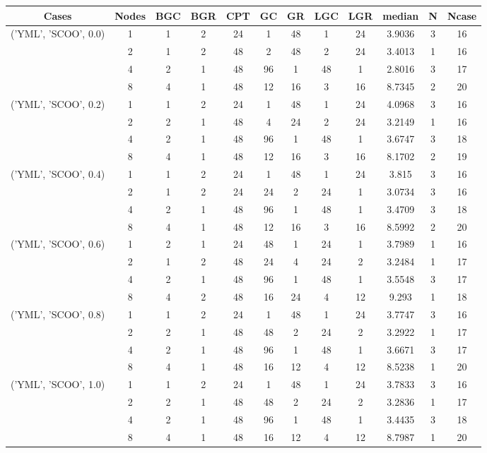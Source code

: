 \begin{tabular}{cccccccccccc}
\hline
Cases & Nodes& BGC& BGR& CPT& GC& GR& LGC& LGR& median & N & Ncase \\
\hline
\multirow{4}{*}{('YML', 'SCOO', 0.0)}& 1& 1& 2& 24& 1& 48& 1& 24& 3.9036& 3& 16\\
& 2& 1& 2& 48& 2& 48& 2& 24& 3.4013& 1& 16\\
& 4& 2& 1& 48& 96& 1& 48& 1& 2.8016& 3& 17\\
& 8& 4& 1& 48& 12& 16& 3& 16& 8.7345& 2& 20\\
\hline
\multirow{4}{*}{('YML', 'SCOO', 0.2)}& 1& 1& 2& 24& 1& 48& 1& 24& 4.0968& 3& 16\\
& 2& 2& 1& 48& 4& 24& 2& 24& 3.2149& 1& 16\\
& 4& 2& 1& 48& 96& 1& 48& 1& 3.6747& 3& 18\\
& 8& 4& 1& 48& 12& 16& 3& 16& 8.1702& 2& 19\\
\hline
\multirow{4}{*}{('YML', 'SCOO', 0.4)}& 1& 1& 2& 24& 1& 48& 1& 24& 3.815& 3& 16\\
& 2& 1& 2& 24& 24& 2& 24& 1& 3.0734& 3& 16\\
& 4& 2& 1& 48& 96& 1& 48& 1& 3.4709& 3& 18\\
& 8& 4& 1& 48& 12& 16& 3& 16& 8.5992& 2& 20\\
\hline
\multirow{4}{*}{('YML', 'SCOO', 0.6)}& 1& 2& 1& 24& 48& 1& 24& 1& 3.7989& 1& 16\\
& 2& 1& 2& 48& 24& 4& 24& 2& 3.2484& 1& 17\\
& 4& 2& 1& 48& 96& 1& 48& 1& 3.5548& 3& 17\\
& 8& 4& 2& 48& 16& 24& 4& 12& 9.293& 1& 18\\
\hline
\multirow{4}{*}{('YML', 'SCOO', 0.8)}& 1& 1& 2& 24& 1& 48& 1& 24& 3.7747& 3& 16\\
& 2& 2& 1& 48& 48& 2& 24& 2& 3.2922& 1& 17\\
& 4& 2& 1& 48& 96& 1& 48& 1& 3.6671& 3& 17\\
& 8& 4& 1& 48& 16& 12& 4& 12& 8.5238& 1& 20\\
\hline
\multirow{4}{*}{('YML', 'SCOO', 1.0)}& 1& 1& 2& 24& 1& 48& 1& 24& 3.7833& 3& 16\\
& 2& 2& 1& 48& 48& 2& 24& 2& 3.2836& 1& 17\\
& 4& 2& 1& 48& 96& 1& 48& 1& 3.4435& 3& 18\\
& 8& 4& 1& 48& 16& 12& 4& 12& 8.7987& 1& 20\\
\hline
\end{tabular}



